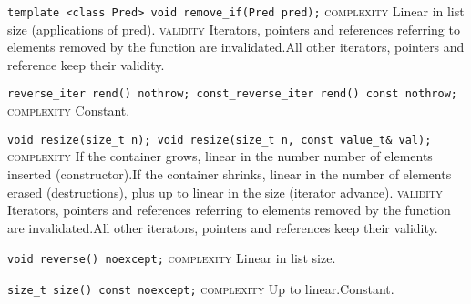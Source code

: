\noindent{}\hspace*{0.25em}\lstinline[basicstyle=\ttfamily\color{corange}]{template <class Pred> void remove_if(Pred pred);} \textsc{complexity} Linear in list size (applications of pred). \textsc{validity} Iterators, pointers and references referring to elements removed by the function are invalidated.All other iterators, pointers and reference keep their validity.\\\vspace{-0.6em}

\noindent{}\hspace*{0.25em}\lstinline[basicstyle=\ttfamily\color{cgreen}]{reverse_iter rend() nothrow; const_reverse_iter rend() const nothrow;} \textsc{complexity} Constant.\\\vspace{-0.6em}

\noindent{}\hspace*{0.25em}\lstinline[basicstyle=\ttfamily\color{corange}]{void resize(size_t n); void resize(size_t n, const value_t& val);} \textsc{complexity} If the container grows, linear in the number number of elements inserted (constructor).If the container shrinks, linear in the number of elements erased (destructions), plus up to linear in the size (iterator advance). \textsc{validity} Iterators, pointers and references referring to elements removed by the function are invalidated.All other iterators, pointers and references keep their validity.\\\vspace{-0.6em}

\noindent{}\hspace*{0.25em}\lstinline[basicstyle=\ttfamily\color{corange}]{void reverse() noexcept;} \textsc{complexity} Linear in list size.\\\vspace{-0.6em}

\noindent{}\hspace*{0.25em}\lstinline[basicstyle=\ttfamily\color{corange}]{size_t size() const noexcept;} \textsc{complexity} Up to linear.Constant.\\\vspace{-0.6em}

